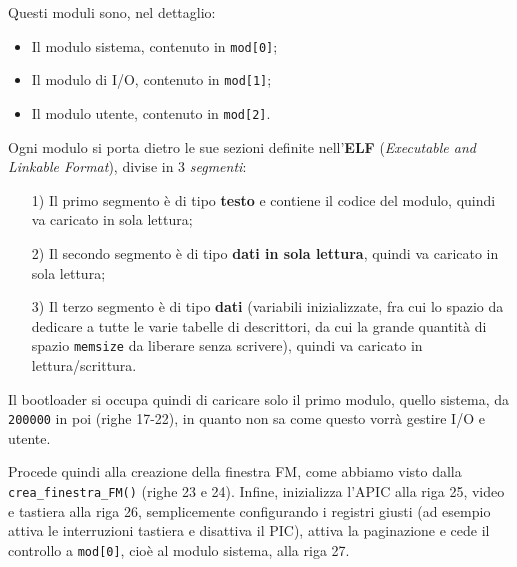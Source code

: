 \documentclass[a4paper,11pt]{article}
\begin{document}
\begin{enumerate}
Questi moduli sono, nel dettaglio:
\begin{itemize}
	\item Il modulo sistema, contenuto in \lstinline|mod[0]|;
	\item Il modulo di I/O, contenuto in \lstinline|mod[1]|;
	\item Il modulo utente, contenuto in \lstinline|mod[2]|.
\end{itemize}
Ogni modulo si porta dietro le sue sezioni definite nell'\textbf{ELF} (\textit{Executable and Linkable Format}), divise in 3 \textit{segmenti}:
\begin{enumerate}
	\item[1)] Il primo segmento è di tipo \textbf{testo} e contiene il codice del modulo, quindi va caricato in sola lettura;
	\item[2)] Il secondo segmento è di tipo \textbf{dati in sola lettura}, quindi va caricato in sola lettura;
	\item[3)] Il terzo segmento è di tipo \textbf{dati} (variabili inizializzate, fra cui lo spazio da dedicare a tutte le varie tabelle di descrittori, da cui la grande quantità di spazio \lstinline|memsize| da liberare senza scrivere), quindi va caricato in lettura/scrittura.
\end{enumerate}

Il bootloader si occupa quindi di caricare solo il primo modulo, quello sistema, da \lstinline|200000| in poi (righe 17-22), in quanto non sa come questo vorrà gestire I/O e utente.

Procede quindi alla creazione della finestra FM, come abbiamo visto dalla \lstinline|crea_finestra_FM()| (righe 23 e 24).
Infine, inizializza l'APIC alla riga 25, video e tastiera alla riga 26, semplicemente configurando i registri giusti (ad esempio attiva le interruzioni tastiera e disattiva il PIC), attiva la paginazione e cede il controllo a \lstinline|mod[0]|, cioè al modulo sistema, alla riga 27.

\newpage


\end{enumerate}
\end{document}
